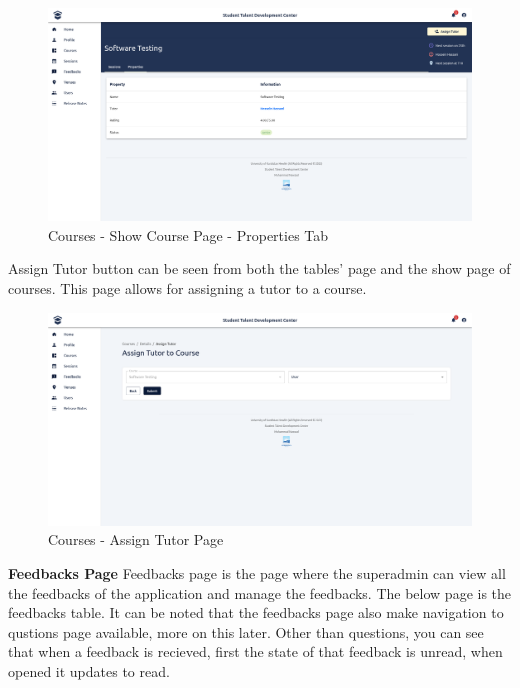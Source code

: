 \begin{justify}
    \begin{figure}[H]
        \centerline{\includegraphics[width=150mm,scale=1]{figures/implementation_and_testing/implementation/frontend/pages/Courses - Properties.png}}
        \caption{Courses - Show Course Page - Properties Tab}
    \end{figure}

    \vspace{0.25cm}
    \newendline Assign Tutor button can be seen from both the tables' page and the show page of courses. This page allows for assigning a tutor to a course.

    \begin{figure}[H]
        \centerline{\includegraphics[width=150mm,scale=1]{figures/implementation_and_testing/implementation/frontend/pages/Courses - Assign Tutor.png}}
        \caption{Courses - Assign Tutor Page}
    \end{figure}
    

    \clearpage
    \noindent \textbf{Feedbacks Page}\newendline
    Feedbacks page is the page where the superadmin can view all the feedbacks of the application and manage the feedbacks. The below page is the feedbacks table. It can be noted that the feedbacks page also make navigation to qustions page available, more on this later. Other than questions, you can see that when a feedback is recieved, first the state of that feedback is unread, when opened it updates to read.


\end{justify}
